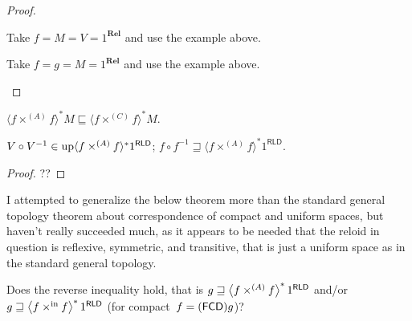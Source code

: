 \begin{proof}
  ~
  \begin{widedisorder}
    \item[\ref{vmv}] Take $f=M=V=1^{\mathbf{Rel}}$ and use the example above.
    \item[\ref{ffm}] Take $f=g=M=1^{\mathbf{Rel}}$ and use the example above.
  \end{widedisorder}
\end{proof}

\begin{cor}
  $\langle f \times^{(A)} f \rangle^{\ast} M \sqsubseteq \langle f \times^{(C)} f
  \rangle^{\ast} M$.
\end{cor}

\begin{cor}
  $V \circ V^{- 1} \in \operatorname{up} \langle f \times^{(A)} f \rangle^{\ast} 1^{\mathsf{RLD}}$; $f
  \circ f^{- 1} \sqsupseteq \langle f \times^{(A)} f \rangle^{\ast} 1^{\mathsf{RLD}}$.
\end{cor}

\begin{proof}
  ??
\end{proof}

\begin{rem}
  I attempted to generalize the below theorem more than the standard general
  topology theorem about correspondence of compact and uniform spaces, but
  haven't really succeeded much, as it appears to be needed that the reloid in
  question is reflexive, symmetric, and transitive, that is just a uniform
  space as in the standard general topology.
\end{rem}

Does the reverse inequality hold, that is
$g \sqsupseteq \left\langle f \times^{(A)} f\right\rangle ^{\ast} 1^{\mathsf{RLD}}$
and/or
$g \sqsupseteq \left\langle f \times^{\mathrm{in}} f\right\rangle ^{\ast} 1^{\mathsf{RLD}}$
(for compact~$f=(\mathsf{FCD}) g$)?

